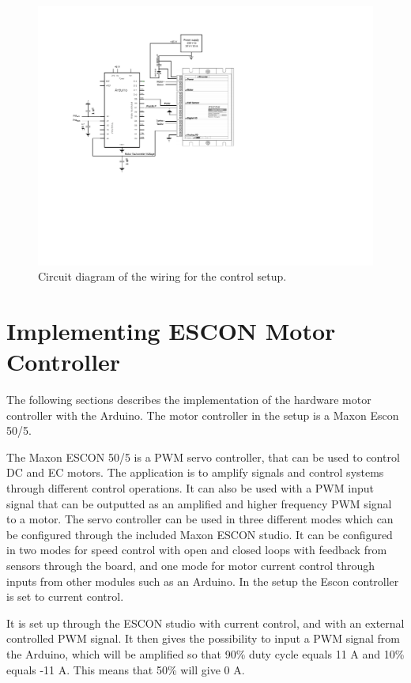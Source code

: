 \begin{figure}[htbp]
\centering
\includegraphics[width=0.85\linewidth]{figures/MotorControllerSetup}
\caption{Circuit diagram of the wiring for the control setup.}
\label{fig:EsconWiring}
\end{figure}
\newpage
\section{Implementing ESCON Motor Controller}
The following sections describes the implementation of the hardware motor controller with the Arduino. The motor controller in the setup is a Maxon Escon 50/5.

The Maxon ESCON 50/5 is a PWM servo controller, that can be used to control DC and EC motors. The application is to amplify signals and control systems through different control operations. It can also be used with a PWM input signal that can be outputted as an amplified and higher frequency PWM signal to a motor. The servo controller can be used in three different modes which can be configured through the included Maxon ESCON studio. It can be configured in two modes for speed control with open and closed loops with feedback from sensors through the board, and one mode for motor current control through inputs from other modules such as an Arduino. In the setup the Escon controller is set to current control.


It is set up through the ESCON studio with current control, and with an external controlled PWM signal. It then gives the possibility to input a PWM signal from the Arduino, which will be amplified so that 90\% duty cycle equals 11 A and 10\% equals -11 A. This means that 50\% will give 0 A.


